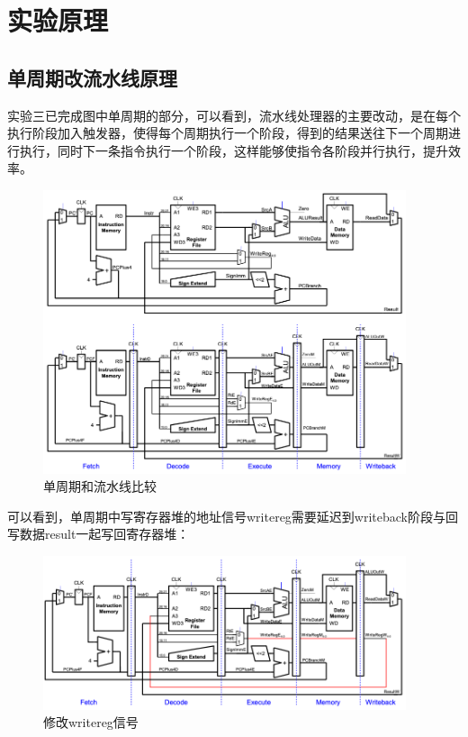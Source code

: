 \section{实验原理}
\subsection{单周期改流水线原理}
实验三已完成图中单周期的部分，可以看到，流水线处理器的主要改动，是在每个执行阶段加入触发器，使得每个周期执行一个阶段，得到的结果送往下一个周期进行执行，同时下一条指令执行一个阶段，这样能够使指令各阶段并行执行，提升效率。 

\begin{figure}[htbp]
    \centering
    \includegraphics[width = 0.95\textwidth]{image/single_piped.png}
    \caption{单周期和流水线比较}
    \label{fig:section_2_0}
\end{figure}

可以看到，单周期中写寄存器堆的地址信号writereg需要延迟到writeback阶段与回写数据result一起写回寄存器堆：

\newpage
\begin{figure}[htbp]
    \centering
    \includegraphics[width = 0.95\textwidth]{image/piped_writereg.png}
    \caption{修改writereg信号}
    \label{fig:section_2_1}
\end{figure}

